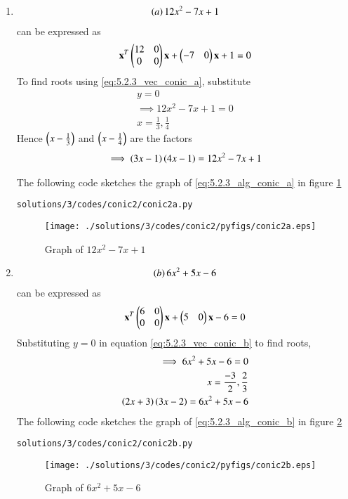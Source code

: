 \begin{enumerate}
%
\item 
\begin{align}
\label{eq:5.2.3_alg_conic_a}
\left(a\right) 12x^{2} - 7x + 1
\end{align}
can be expressed  as 
\begin{align}
\label{eq:5.2.3_vec_conic_a}
\mathbf{x}^T \begin{pmatrix}12 & 0\\0 & 0\end{pmatrix}\mathbf{x}+ \begin{pmatrix}-7 & 0\end{pmatrix}\mathbf{x}+1=0
\end{align}
To find roots using \ref{eq:5.2.3_vec_conic_a}, substitute
\begin{align}
y=0
\\
\implies 
12x^{2}-7x+1=0
\\
x=\frac{1}{3}, \frac{1}{4}
\end{align}
Hence $\left(x-\frac{1}{3}\right)$ and $\left(x-\frac{1}{4}\right)$ are the factors
\begin{align}
\implies \left(3x-1\right)\left(4x-1\right)=12x^{2} - 7x + 1 
\end{align}

The following code sketches the graph of \ref{eq:5.2.3_alg_conic_a} in figure \ref{fig:5.2.3_conic2a}
\begin{lstlisting}
solutions/3/codes/conic2/conic2a.py
\end{lstlisting}
\begin{figure}[!ht]
\centering
\texttt{[image: ./solutions/3/codes/conic2/pyfigs/conic2a.eps]}
\caption{Graph of $12x^{2} - 7x + 1$}
\label{fig:5.2.3_conic2a}
\end{figure}


\item 
\begin{align}
\label{eq:5.2.3_alg_conic_b}
\left(b\right) 6x^{2} + 5x -6
\end{align}
can be expressed  as 
\begin{align}
\label{eq:5.2.3_vec_conic_b}
\mathbf{x}^T \begin{pmatrix}6 & 0\\0 & 0\end{pmatrix}\mathbf{x}+ \begin{pmatrix}5 & 0\end{pmatrix}\mathbf{x} -6 =0
\end{align}
Substituting $y=0$ in equation \ref{eq:5.2.3_vec_conic_b} to find roots,
\begin{align}
\implies 
6x^{2}+5x-6=0
\\
x=\frac{-3}{2}, \frac{2}{3}
\\
\left(2x+3\right)\left(3x-2\right)= 6x^{2} + 5x -6
\end{align}
The following code sketches the graph of \ref{eq:5.2.3_alg_conic_b} in figure \ref{fig:5.2.3_conic2b}
\begin{lstlisting}
solutions/3/codes/conic2/conic2b.py
\end{lstlisting}
\begin{figure}[!ht]
\centering
\texttt{[image: ./solutions/3/codes/conic2/pyfigs/conic2b.eps]}
\caption{Graph of $6x^{2} + 5x -6$}
\label{fig:5.2.3_conic2b}
\end{figure}


\end{enumerate}

